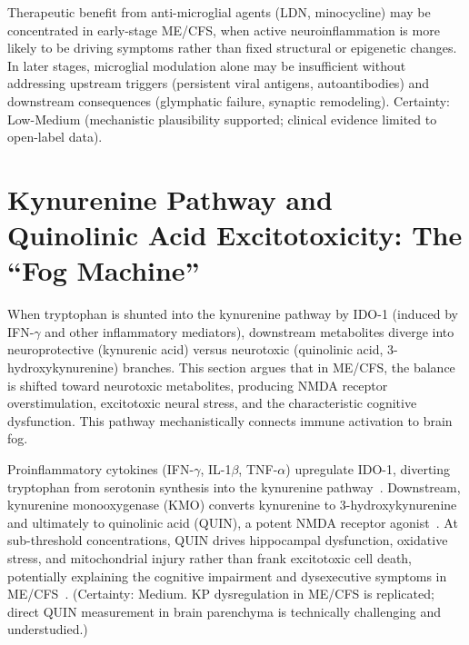\begin{hypothesis}
\label{hyp:microglia-stage-therapy}
Therapeutic benefit from anti-microglial agents (LDN, minocycline) may be concentrated in early-stage ME/CFS, when active neuroinflammation is more likely to be driving symptoms rather than fixed structural or epigenetic changes. In later stages, microglial modulation alone may be insufficient without addressing upstream triggers (persistent viral antigens, autoantibodies) and downstream consequences (glymphatic failure, synaptic remodeling). Certainty: Low-Medium (mechanistic plausibility supported; clinical evidence limited to open-label data).
\end{hypothesis}


\section{Kynurenine Pathway and Quinolinic Acid Excitotoxicity: The ``Fog Machine''}
\label{sec:ch15-kynurenine}

When tryptophan is shunted into the kynurenine pathway by IDO-1 (induced by IFN-$\gamma$ and other inflammatory mediators), downstream metabolites diverge into neuroprotective (kynurenic acid) versus neurotoxic (quinolinic acid, 3-hydroxykynurenine) branches. This section argues that in ME/CFS, the balance is shifted toward neurotoxic metabolites, producing NMDA receptor overstimulation, excitotoxic neural stress, and the characteristic cognitive dysfunction. This pathway mechanistically connects immune activation to brain fog.

\begin{hypothesis}
\label{hyp:ch15-kynurenine-QUIN}
Proinflammatory cytokines (IFN-$\gamma$, IL-1$\beta$, TNF-$\alpha$) upregulate IDO-1, diverting tryptophan from serotonin synthesis into the kynurenine pathway~\cite{Huang2020IDO, Kavyani2022kynurenine}. Downstream, kynurenine monooxygenase (KMO) converts kynurenine to 3-hydroxykynurenine and ultimately to quinolinic acid (QUIN), a potent NMDA receptor agonist~\cite{LugoHuitron2013quinolinic}. At sub-threshold concentrations, QUIN drives hippocampal dysfunction, oxidative stress, and mitochondrial injury rather than frank excitotoxic cell death, potentially explaining the cognitive impairment and dysexecutive symptoms in ME/CFS~\cite{Kavyani2022kynurenine, Dehhaghi2022kynurenine}.
(Certainty: Medium. KP dysregulation in ME/CFS is replicated; direct QUIN measurement in brain parenchyma is technically challenging and understudied.)
\end{hypothesis}

